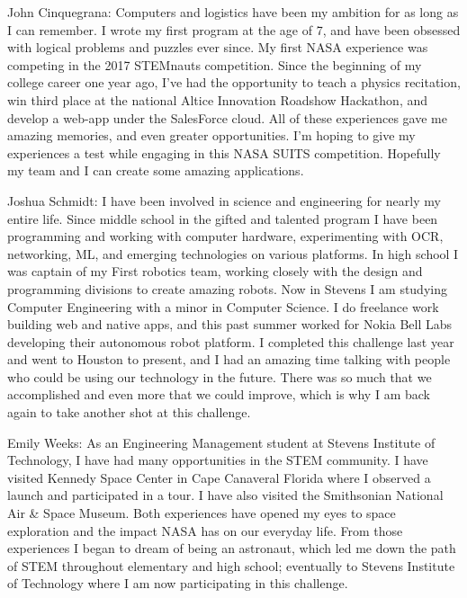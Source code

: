 \documentclass{article}
\begin{document}
John Cinquegrana: Computers and logistics have been my ambition for as long as I can remember. I wrote my first program at the age of 7, and have been obsessed with logical problems and puzzles ever since. My first NASA experience was competing in the 2017 STEMnauts competition. Since the beginning of my college career one year ago, I've had the opportunity to teach a physics recitation, win third place at the national Altice Innovation Roadshow Hackathon, and develop a web-app under the SalesForce cloud. All of these experiences gave me amazing memories, and even greater opportunities. I'm hoping to give my experiences a test while engaging in this NASA SUITS competition. Hopefully my team and I can create some amazing applications.

Joshua Schmidt: I have been involved in science and engineering for nearly my entire life. Since middle school in the gifted and talented program I have been programming and working with computer hardware, experimenting with OCR, networking, ML, and emerging technologies on various platforms. In high school I was captain of my First robotics team, working closely with the design and programming divisions to create amazing robots. Now in Stevens I am studying Computer Engineering with a minor in Computer Science. I do freelance work building web and native apps, and this past summer worked for Nokia Bell Labs developing their autonomous robot platform. I completed this challenge last year and went to Houston to present, and I had an amazing time talking with people who could be using our technology in the future. There was so much that we accomplished and even more that we could improve, which is why I am back again to take another shot at this challenge.

Emily Weeks: As an Engineering Management student at Stevens Institute of Technology, I have had many opportunities in the STEM community. I have visited Kennedy Space Center in Cape Canaveral Florida where I observed a launch and participated in a tour. I have also visited the Smithsonian National Air \& Space Museum. Both experiences have opened my eyes to space exploration and the impact NASA has on our everyday life. From those experiences I began to dream of being an astronaut, which led me down the path of STEM throughout elementary and high school; eventually to Stevens Institute of Technology where I am now participating in this challenge.
\end{document}
